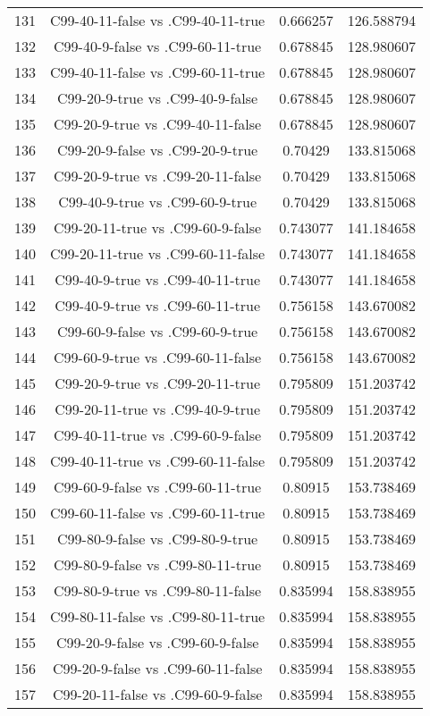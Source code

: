 \documentclass[a4paper,10pt]{article}
\begin{document}
\begin{landscape}
\begin{table}[!htp]
\begin{tabular}{cccc}
131&C99-40-11-false vs .C99-40-11-true&0.666257&126.588794\\
132&C99-40-9-false vs .C99-60-11-true&0.678845&128.980607\\
133&C99-40-11-false vs .C99-60-11-true&0.678845&128.980607\\
134&C99-20-9-true vs .C99-40-9-false&0.678845&128.980607\\
135&C99-20-9-true vs .C99-40-11-false&0.678845&128.980607\\
136&C99-20-9-false vs .C99-20-9-true&0.70429&133.815068\\
137&C99-20-9-true vs .C99-20-11-false&0.70429&133.815068\\
138&C99-40-9-true vs .C99-60-9-true&0.70429&133.815068\\
139&C99-20-11-true vs .C99-60-9-false&0.743077&141.184658\\
140&C99-20-11-true vs .C99-60-11-false&0.743077&141.184658\\
141&C99-40-9-true vs .C99-40-11-true&0.743077&141.184658\\
142&C99-40-9-true vs .C99-60-11-true&0.756158&143.670082\\
143&C99-60-9-false vs .C99-60-9-true&0.756158&143.670082\\
144&C99-60-9-true vs .C99-60-11-false&0.756158&143.670082\\
145&C99-20-9-true vs .C99-20-11-true&0.795809&151.203742\\
146&C99-20-11-true vs .C99-40-9-true&0.795809&151.203742\\
147&C99-40-11-true vs .C99-60-9-false&0.795809&151.203742\\
148&C99-40-11-true vs .C99-60-11-false&0.795809&151.203742\\
149&C99-60-9-false vs .C99-60-11-true&0.80915&153.738469\\
150&C99-60-11-false vs .C99-60-11-true&0.80915&153.738469\\
151&C99-80-9-false vs .C99-80-9-true&0.80915&153.738469\\
152&C99-80-9-false vs .C99-80-11-true&0.80915&153.738469\\
153&C99-80-9-true vs .C99-80-11-false&0.835994&158.838955\\
154&C99-80-11-false vs .C99-80-11-true&0.835994&158.838955\\
155&C99-20-9-false vs .C99-60-9-false&0.835994&158.838955\\
156&C99-20-9-false vs .C99-60-11-false&0.835994&158.838955\\
157&C99-20-11-false vs .C99-60-9-false&0.835994&158.838955\\

\end{tabular}
\end{table}
\end{landscape}
\end{document}
